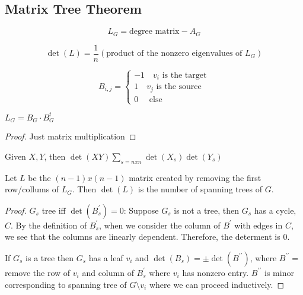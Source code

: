 \subsection{Matrix Tree Theorem}

\begin{definition}[laplacian]
    \label{def:laplacian}
    \[
        L_G = \text{degree matrix} - A_G
    \]
\end{definition}

\begin{note}
    \[
        \det(L) = \frac{1}{n} (\text{product of the nonzero eigenvalues of \(L_G\)})
    \]
\end{note} 

\begin{definition}
    \label{def:incidence matix of directed graph}
    \[
        B_{i,j} =
        \begin{cases}
            -1 \quad v_i \text{ is the target} \\
            1 \quad v_j \text{ is the source} \\
            0 \quad \text{ else}
        \end{cases}
    \]
\end{definition}  

\begin{lemma}
    \(L_G = B_G \cdot B_G^t\) 
\end{lemma}
\begin{proof}
    Just matrix multiplication
\end{proof}

\begin{theorem}
    \label{thm:cauchy-binet}
    Given \(X, Y\), then \(\det(XY) \sum_{s = n x n} \det (X_s) \det(Y_s)\)  
\end{theorem} 

\begin{theorem}
    \label{thm:matrix tree}
    Let \(L\) be the \((n-1) x (n-1)\) matrix created by removing the first row/collums of \(L_G\). Then \(\det(L)\) is the number of spanning trees of \(G\). 
\end{theorem}
\begin{proof}
    \(G_s\) tree iff \(\det (B_s^\prime) = 0\):
    Suppose \(G_s\) is not a tree, then \(G_s\) has a cycle, \(C\). By the definition of \(B_s^\prime\), when we consider the column of \(B^\prime\) with edges in \(C\), we see that the columns are linearly dependent. Therefore, the determent is \(0\).

    If \(G_s\) is a tree then \(G_s\) has a leaf \(v_i\) and \(\det (B_s) = \pm \det (B^{\prime\prime})\), where \(B^{\prime\prime} =\) remove the row of \(v_i\) and column of \(B_s^\prime\) where \(v_i\) has nonzero entry. \(B^{\prime \prime}\) is minor corresponding to spanning tree of \(G\setminus{v_i}\) where we can proceed inductively. 
\end{proof}
